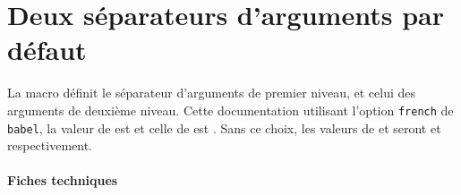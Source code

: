 \documentclass[12pt,a4paper]{article}
\begin{document}
\section{Deux séparateurs d'arguments par défaut}

La macro  définit le séparateur d'arguments de premier niveau, et  celui des arguments de deuxième niveau.
Cette documentation utilisant l'option \verb+french+ de \verb+babel+, la valeur de 
 est \fbox{\,\lymathsep$\vphantom{F}$\,} 
et celle de
 est \fbox{\,\lymathsubsep$\vphantom{F}$\,} .
Sans ce choix, les valeurs de  et  seront \fbox{\,\lymathsubsep$\vphantom{F}$\,} et \fbox{\,\lymathsep$\vphantom{F}$\,} respectivement.


\paragraph{Fiches techniques}


\end{document}
